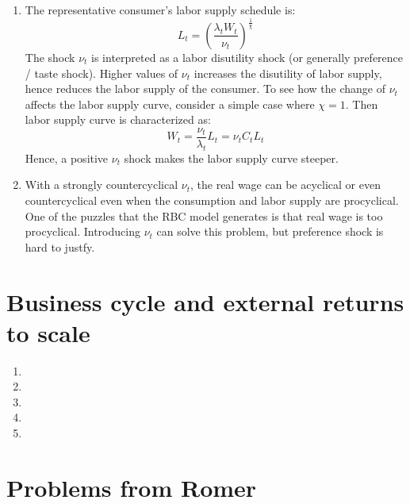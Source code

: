 \documentclass[11pt]{amsart}
\begin{document}
\begin{enumerate}[label=(\alph*)]
	\item The representative consumer's labor supply schedule is: 
	\begin{equation*}
	L_t = \left( \frac{\lambda_t W_t}{\nu_t} \right)^{\frac{1}{\chi}}
	\end{equation*}
	The shock $\nu_t$ is interpreted as a labor disutility shock (or generally preference / taste shock). Higher values of $\nu_t$ increases the disutility of labor supply, hence reduces the labor supply of the consumer. To see how the change of $\nu_t$ affects the labor supply curve, consider a simple case where $\chi = 1$. Then labor supply curve is characterized as: 
	\begin{equation*}
	W_t = \frac{\nu_t}{\lambda_t} L_t = \nu_t C_t L_t  
	\end{equation*}
	Hence, a positive $\nu_t$ shock makes the labor supply curve steeper. 
	
	\item With a strongly countercyclical $\nu_t$, the real wage can be acyclical or even countercyclical even when the consumption and labor supply are procyclical. One of the puzzles that the RBC model generates is that real wage is too procyclical. Introducing $\nu_t$ can solve this problem, but preference shock is hard to justfy.  
\end{enumerate}
\section{Business cycle and external returns to scale}
\begin{enumerate}[label=(\alph*)]
	\item 
	\item
	\item
	\item
	\item
\end{enumerate}
\section{Problems from Romer}
\end{document}
